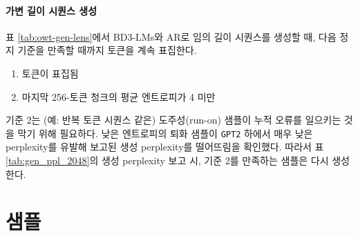 \documentclass{article} %
\def\algos{BD3-LMs}
\begin{document}
    \paragraph{가변 길이 시퀀스 생성}
    표 \ref{tab:owt-gen-lens}에서 \algos{}와 AR로 임의 길이 시퀀스를 생성할 때, 다음 정지 기준을 만족할 때까지 토큰을 계속 표집한다.
    \begin{enumerate}
        \item [EOS] 토큰이 표집됨
        \item 마지막 256-토큰 청크의 평균 엔트로피가 4 미만
    \end{enumerate}
    \noindent 기준 2는 (예: 반복 토큰 시퀀스 같은) 도주성(run-on) 샘플이 누적 오류를 일으키는 것을 막기 위해 필요하다. 낮은 엔트로피의 퇴화 샘플이 \texttt{GPT2} 하에서 매우 낮은 perplexity를 유발해 보고된 생성 perplexity를 떨어뜨림을 확인했다. 따라서 표 \ref{tab:gen_ppl_2048}의 생성 perplexity 보고 시, 기준 2를 만족하는 샘플은 다시 생성한다.
\section{샘플}\label{suppl:summaries}

\newpage

\newpage



% 
% 




\end{document}
